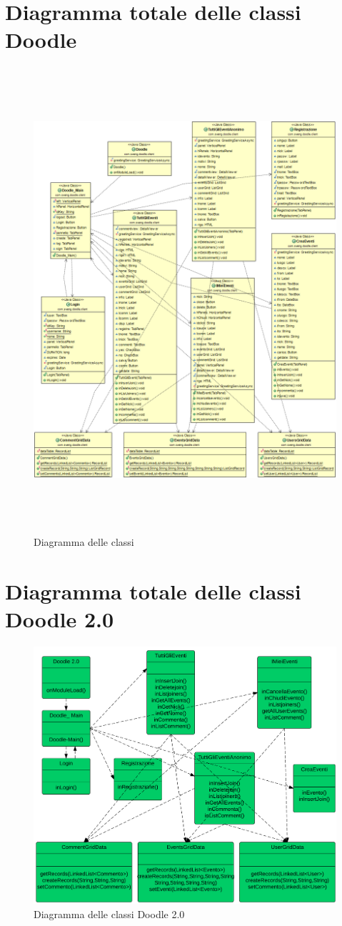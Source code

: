 \section{Diagramma totale delle classi Doodle}
\begin{figure}[!ht]
\centering
\includegraphics[width=14cm, height=17.2cm]{img/classi/diagrammaclassi.png}
\caption{Diagramma delle classi}
\label{fig:diagclassi}
\end{figure}

\section{Diagramma totale delle classi Doodle 2.0 }
\begin{figure}[!ht]
	\centering
	\includegraphics[]{img/classi/diagrammaclassi2.png}
	\caption{Diagramma delle classi Doodle 2.0}
	\label{fig:diagclassi2}
\end{figure}
